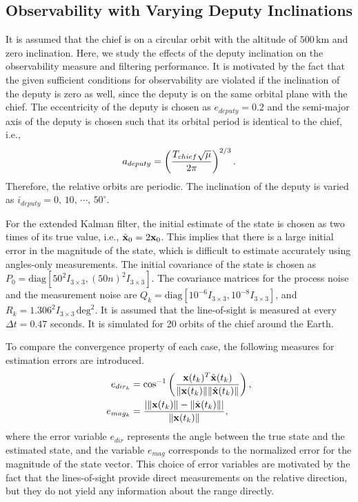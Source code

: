\subsection{Observability with Varying Deputy Inclinations}

It is assumed that the chief is on a circular orbit with the altitude of $500\,\mathrm{km}$ and zero inclination. Here, we study the effects of the deputy inclination on the observability measure and filtering performance. It is motivated by the fact that the given sufficient conditions for observability are violated if the inclination of the deputy is zero as well, since the deputy is on the same orbital plane with the chief. The eccentricity of the deputy is chosen as $e_{deputy}=0.2$ and the semi-major axis of the deputy is chosen such that its orbital period is identical to the chief, i.e.,
\begin{align*}
a_{deputy} = \left( \frac{T_{chief}\sqrt{\mu}}{2\pi} \right)^{2/3}.
\end{align*}
Therefore, the relative orbits are periodic. The inclination of the deputy is varied as $i_{deputy}=0,\,10,\,\cdots,\,50^\circ$. 

For the extended Kalman filter, the initial estimate of the state is chosen as two times of its true value, i.e., $\hat{\mathbf{x}}_0=2\mathbf{x}_0$. This implies that there is a large initial error in the magnitude of the state, which is difficult to estimate accurately using angles-only measurements. The initial covariance of the state is chosen as $P_0=\mathrm{diag}[50^2I_{3\times 3}, (50n)^2I_{3\times 3}]$. The covariance matrices for the process noise and the measurement noise are $Q_k=\mathrm{diag}[10^{-6}I_{3\times 3}, 10^{-8}I_{3\times 3}]$, and $R_k=1.306^2 I_{3\times 3}\,\mathrm{deg}^2$. It is assumed that the line-of-sight is measured at every $\Delta t = 0.47$ seconds. It is simulated for 20 orbits of the chief around the Earth. 

To compare the convergence property of each case, the following measures for estimation errors are introduced.
\begin{align*}
e_{dir_k}  & = \cos^{-1}\left( \frac{\mathbf{x}(t_k)^T \hat{\mathbf{x}} (t_k)}
{\|\mathbf{x}(t_k)\| \|\hat{\mathbf{x}} (t_k)\|} \right),\\
e_{mag_k}  & = 
\frac{|\|\mathbf{x}(t_k)\|-\|\hat{\mathbf{x}} (t_k)\||}{\|\mathbf{x}(t_k)\|},
\end{align*}
where the error variable $e_{dir}$ represents the angle between the true state and the estimated state, and the variable $e_{mag}$ corresponds to the normalized error for the magnitude of the state vector. This choice of error variables are motivated by the fact that the lines-of-sight provide direct measurements on the relative direction, but they do not yield any information about the range directly. 

